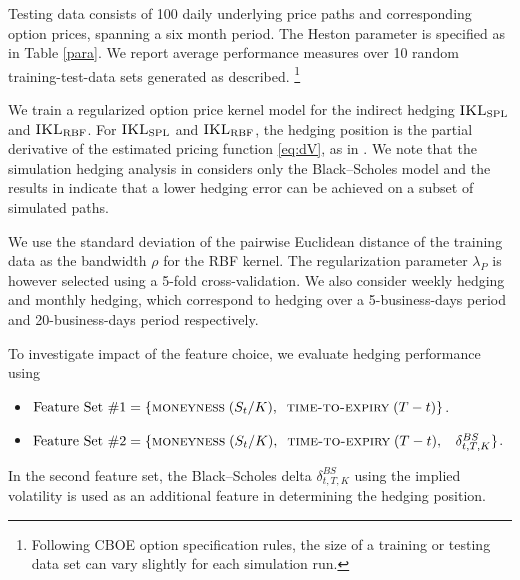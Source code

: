 \documentclass[letterpaper,12pt,titlepage,oneside,final]{book}
\numberwithin{equation}{section}
\theoremstyle{definition}
\newcommand{\IKLs}{\bf\textsc{IKL}_{\text{SPL}}}
\newcommand{\IKLg}{\bf\textsc{IKL}_{\text{RBF}}}
\begin{document}
Testing data consists of 100 daily underlying price paths and corresponding option prices, spanning a six month period. The Heston parameter is  specified as in Table \ref{para}. We report average performance measures over 10 random training-test-data sets generated as described. \footnote{Following CBOE option specification rules, the size of a training or testing data set can vary slightly for each simulation run.}



We train a regularized option price kernel model for the indirect hedging $\IKLs$ and $\IKLg$. For $\IKLs$ and $\IKLg$,
the hedging position is  the partial derivative of the estimated pricing function  \eqref{eq:dV},  as in \citep{hutchinson}. We note that the simulation hedging analysis in \cite{hutchinson} considers only the Black–Scholes model and the results in \citep{hutchinson} indicate that a lower hedging error can be achieved on a subset of simulated paths.


 We use the standard deviation of the pairwise Euclidean distance of the training data as the bandwidth $\rho$ for the RBF kernel. The regularization parameter $\lambda_P$  is however selected using a 5-fold cross-validation. We also consider weekly hedging and monthly hedging, which correspond to hedging over a 5-business-days period and 20-business-days period respectively.

To investigate impact of the feature choice,  we evaluate hedging performance using
\begin{itemize}
\item
$\text{Feature Set \#1} = \{\textsc{moneyness}\; (S_t/K),\;\;\textsc{time-to-expiry}\; (T-t)\}$.
\item
$\text{Feature Set \#2} = \{\textsc{moneyness} \;(S_t/K),\;\;\textsc{time-to-expiry} \;(T-t) ,\;\;~ \delta^{BS}_{t,T,K}\}$.
\end{itemize}
In the second feature set,  the Black–Scholes delta $\delta^{BS}_{t,T,K}$ using the implied volatility  is used as an additional feature in determining the hedging position. 
\end{document}
